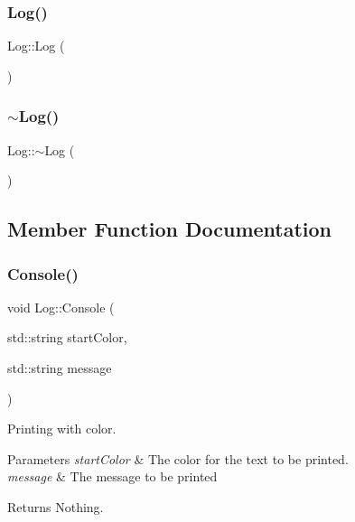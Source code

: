\subsubsection{\texorpdfstring{Log()}{Log()}}
{\footnotesize\ttfamily Log\+::\+Log (\begin{DoxyParamCaption}{ }\end{DoxyParamCaption})\hspace{0.3cm}{\ttfamily [private]}}

\mbox{\label{classLog_a0fbfda88fbee5027c89f6eb121059360}} 
\subsubsection{\texorpdfstring{$\sim$Log()}{~Log()}}
{\footnotesize\ttfamily Log\+::$\sim$\+Log (\begin{DoxyParamCaption}{ }\end{DoxyParamCaption})\hspace{0.3cm}{\ttfamily [private]}}



\subsection{Member Function Documentation}
\mbox{\label{classLog_ab03809956a91617a2a8debef16111824}} 
\subsubsection{\texorpdfstring{Console()}{Console()}\hspace{0.1cm}{\footnotesize\ttfamily [1/2]}}
{\footnotesize\ttfamily void Log\+::\+Console (\begin{DoxyParamCaption}\item[{std\+::string}]{start\+Color,  }\item[{std\+::string}]{message }\end{DoxyParamCaption})\hspace{0.3cm}{\ttfamily [static]}}

Printing with color. 
\begin{DoxyParams}{Parameters}
{\em start\+Color} & The color for the text to be printed. \\
\hline
{\em message} & The message to be printed \\
\hline
\end{DoxyParams}
\begin{DoxyReturn}{Returns}
Nothing. 
\end{DoxyReturn}
\mbox{\label{classLog_a17f7b098fc056675e98a900f85c9c9ae}} 
